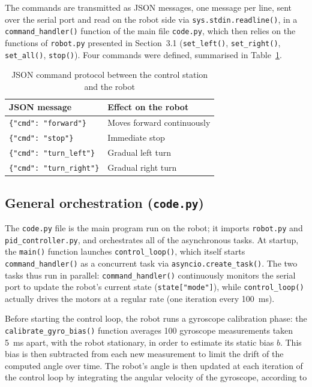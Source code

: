 \documentclass[12pt,a4paper]{report}
\begin{document}
	The commands are transmitted as JSON messages, one message per line, sent over the serial port and read on the robot side via \texttt{sys.stdin.readline()}, in a \texttt{command\_handler()} function of the main file \texttt{code.py}, which then relies on the functions of \texttt{robot.py} presented in Section~3.1 (\texttt{set\_left()}, \texttt{set\_right()}, \texttt{set\_all()}, \texttt{stop()}). Four commands were defined, summarised in Table~\ref{tab:protocole-json}.
	
	\begin{table}[H]
		\centering
		\small
		\renewcommand{\arraystretch}{1.2}
		\begin{tabular}{ll}
			\toprule
			\textbf{JSON message} & \textbf{Effect on the robot} \\
			\midrule
			\texttt{\{"cmd": "forward"\}} & Moves forward continuously \\
			\texttt{\{"cmd": "stop"\}} & Immediate stop \\
			\texttt{\{"cmd": "turn\_left"\}} & Gradual left turn \\
			\texttt{\{"cmd": "turn\_right"\}} & Gradual right turn \\
			\bottomrule
		\end{tabular}
		\caption{JSON command protocol between the control station and the robot}
		\label{tab:protocole-json}
	\end{table}
	
	\subsection*{General orchestration (\texttt{code.py})}
	
	The \texttt{code.py} file is the main program run on the robot; it imports \texttt{robot.py} and \\ \texttt{pid\_controller.py}, and orchestrates all of the asynchronous tasks. At startup, the \texttt{main()} function launches \texttt{control\_loop()}, which itself starts\\ \texttt{command\_handler()} as a concurrent task via \texttt{asyncio.create\_task()}. The two tasks thus run in parallel: \texttt{command\_handler()} continuously monitors the serial port to update the robot's current state (\texttt{state["mode"]}), while \texttt{control\_loop()} actually drives the motors at a regular rate (one iteration every 100~ms).
	
	Before starting the control loop, the robot runs a gyroscope calibration phase: the \texttt{calibrate\_gyro\_bias()} function averages 100 gyroscope measurements taken 5~ms apart, with the robot stationary, in order to estimate its static bias $b$. This bias is then subtracted from each new measurement to limit the drift of the computed angle over time. The robot's angle is then updated at each iteration of the control loop by integrating the angular velocity of the gyroscope, according to
	
\end{document}
